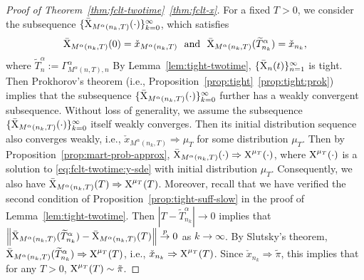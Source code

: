\documentclass[11pt]{article}
\theoremstyle{plain}
\theoremstyle{definition}
\def\ermX{{\textnormal{X}}}
\newcommand{\xcheck}{{\check{x}}}
\newcommand{\xbar}{{\bar{\textnormal{X}}}}
\newcommand{\xx}{{x}}
\def\weakconverge{\Rightarrow}
\begin{document}
\begin{appendix}
\begin{proof}[Proof of Theorem~\ref{thm:fclt-twotime}~\ref{thm:fclt-x}]
    For a fixed $T>0$, we consider the subsequence $\{ \xbar_{M^\alpha(n_k, T)}(\cdot) \}_{k=0}^\infty$, which satisfies 
    \begin{align*}
        \xbar_{M^\alpha(n_k, T)}(0) = \xcheck_{M^\alpha(n_k, T)} \ \text{ and }\  \xbar_{M^\alpha(n_k, T)}( \widetilde{T}^\alpha_{n_k})= \xcheck_{n_k},
    \end{align*}
    where $\widetilde{T}^\alpha_{n} := \Gamma^\alpha_{M^\alpha(n,T), n}$
    By Lemma~\ref{lem:tight-twotime}, $\{ \xbar_{n}(t) \}_{n=1}^\infty$ is tight. Then Prokhorov's theorem (i.e., Proposition~\ref{prop:tight}~\ref{prop:tight:prok}) implies that the subsequence $\{ \xbar_{M^\alpha(n_k, T)}(\cdot) \}_{k=0}^\infty$ further has a weakly convergent subsequence.
    Without loss of generality, we assume the subsequence $\{ \xbar_{M^\alpha(n_k, T)}(\cdot) \}_{k=0}^\infty$ itself weakly converges.
    Then its initial distribution sequence also converges weakly, i.e., $\xcheck_{M^\alpha(n_k, T)} \weakconverge \mu_T$ for some distribution $\mu_T$.
    Then by Proposition~\ref{prop:mart-prob-approx}, $\xbar_{M^\alpha(n_k, T)}(\cdot) \weakconverge \ermX^{\mu_T}(\cdot) $, where $\ermX^{\mu_T}(\cdot)$ is a solution to \eqref{eq:fclt-twotime:y-sde} with initial distribution $\mu_T$.
    Consequently, we also have $\xbar_{M^\alpha(n_k, T)}(T) \weakconverge \ermX^{\mu_T}(T)$.
    Moreover, recall that we have verified the second condition of Proposition~\ref{prop:tight-suff-slow} in the proof of Lemma~\ref{lem:tight-twotime}. Then $|T - \widetilde{T}^\alpha_{n_k}| \to 0$ implies that $\left\| \xbar_{M^\alpha(n_k, T)}(\widetilde{T}^\alpha_{n_k}) - \xbar_{M^\alpha(n_k, T)}(T) \right\| \overset{p}{\rightarrow} 0$ as $k \to \infty$. 
    By Slutsky's theorem,
    $\xbar_{M^\alpha(n_k, T)}(\widetilde{T}^\alpha_{n_k}) \weakconverge \ermX^{\mu_T}(T)$, i.e., $\xcheck_{n_k} \weakconverge \ermX^{\mu_T}(T)$. 
    Since $\xcheck_{n_k} \weakconverge \tilde\pi$, this implies that for any $T > 0$, $\ermX^{\mu_T}(T) \sim  \tilde{\pi}$.
    \vspace{0.1cm}
    

\end{proof}
\end{appendix}
\end{document}

